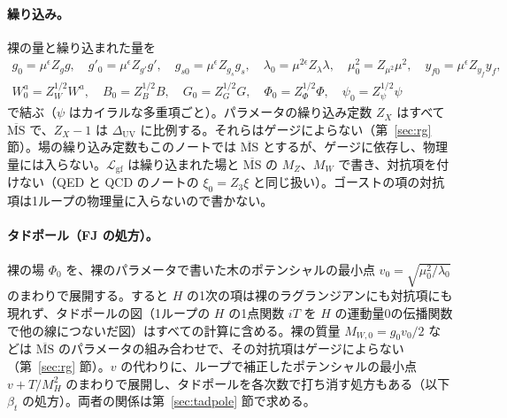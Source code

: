 \documentclass[a4paper,10pt]{ltjsarticle}
\newcommand{\MSbar}{\overline{\mathrm{MS}}}
\newcommand{\DUV}{\Delta_{\mathrm{UV}}}
\begin{document}
\paragraph{繰り込み。}裸の量と繰り込まれた量を
\begin{equation}
\begin{gathered}
g_0=\mu^\epsilon Z_gg,\quad g'_0=\mu^\epsilon Z_{g'}g',\quad g_{s0}=\mu^\epsilon Z_{g_s}g_s,\quad
\lambda_0=\mu^{2\epsilon}Z_\lambda\lambda,\quad \mu_0^2=Z_{\mu^2}\mu^2,\quad y_{f0}=\mu^\epsilon Z_{y_f}y_f,\\
W^a_0=Z_W^{1/2}W^a,\quad B_0=Z_B^{1/2}B,\quad G_0=Z_G^{1/2}G,\quad \Phi_0=Z_\Phi^{1/2}\Phi,\quad \psi_0=Z_\psi^{1/2}\psi
\end{gathered}
\label{eq:bare}
\end{equation}
で結ぶ（$\psi$ はカイラルな多重項ごと）。パラメータの繰り込み定数 $Z_X$ はすべて $\MSbar$ で、$Z_X-1$ は $\DUV$ に比例する。それらはゲージによらない（第~\ref{sec:rg} 節）。場の繰り込み定数もこのノートでは $\MSbar$ とするが、ゲージに依存し、物理量には入らない。$\mathcal L_{\mathrm{gf}}$ は繰り込まれた場と $\MSbar$ の $M_Z$、$M_W$ で書き、対抗項を付けない（QED と QCD のノートの $\xi_0=Z_3\xi$ と同じ扱い）。ゴーストの項の対抗項は1ループの物理量に入らないので書かない。

\paragraph{タドポール（FJ の処方）。}裸の場 $\Phi_0$ を、裸のパラメータで書いた木のポテンシャルの最小点 $v_0=\sqrt{\mu_0^2/\lambda_0}$ のまわりで展開する。すると $H$ の1次の項は裸のラグランジアンにも対抗項にも現れず、タドポールの図（1ループの $H$ の1点関数 $iT$ を $H$ の運動量0の伝播関数で他の線につないだ図）はすべての計算に含める。裸の質量 $M_{W,0}=g_0v_0/2$ などは $\MSbar$ のパラメータの組み合わせで、その対抗項はゲージによらない（第~\ref{sec:rg} 節）。$v$ の代わりに、ループで補正したポテンシャルの最小点 $v+T/M_H^2$ のまわりで展開し、タドポールを各次数で打ち消す処方もある（以下 $\beta_t$ の処方）。両者の関係は第~\ref{sec:tadpole} 節で求める。
\end{document}

